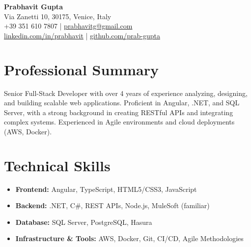 \documentclass[11pt,a4paper]{article}
\begin{document}
\begin{center}
    {\Huge \textbf{Prabhavit Gupta}} \\
    \vspace{2mm}
    Via Zanetti 10, 30175, Venice, Italy \\
    +39 351 610 7807 | \href{mailto:prabhavitg@gmail.com}{prabhavitg@gmail.com} \\
    \href{https://www.linkedin.com/in/prabhavit/}{linkedin.com/in/prabhavit} | \href{https://github.com/prab-gupta}{github.com/prab-gupta}
\end{center}

\vspace{5mm}
\section*{Professional Summary}
Senior Full-Stack Developer with over 4 years of experience analyzing, designing, and building scalable web applications. Proficient in Angular, .NET, and SQL Server, with a strong background in creating RESTful APIs and integrating complex systems. Experienced in Agile environments and cloud deployments (AWS, Docker).

\vspace{2mm}
\section*{Technical Skills}
\begin{itemize}[leftmargin=*]
    \item \textbf{Frontend:} Angular, TypeScript, HTML5/CSS3, JavaScript
    \item \textbf{Backend:} .NET, C\#, REST APIs, Node.js, MuleSoft (familiar)
    \item \textbf{Database:} SQL Server, PostgreSQL, Hasura
    \item \textbf{Infrastructure \& Tools:} AWS, Docker, Git, CI/CD, Agile Methodologies
\end{itemize}

\vspace{2mm}
\end{document}
